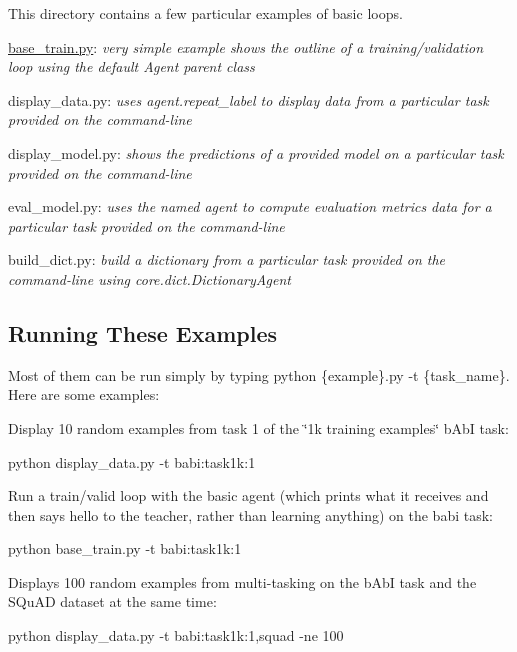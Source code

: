 This directory contains a few particular examples of basic loops.


\begin{DoxyItemize}
\item \hyperlink{base__train_8py}{base\+\_\+train.\+py}\+: {\itshape very simple example shows the outline of a training/validation loop using the default Agent parent class}
\item display\+\_\+data.\+py\+: {\itshape uses agent.\+repeat\+\_\+label to display data from a particular task provided on the command-\/line}
\item display\+\_\+model.\+py\+: {\itshape shows the predictions of a provided model on a particular task provided on the command-\/line}
\item eval\+\_\+model.\+py\+: {\itshape uses the named agent to compute evaluation metrics data for a particular task provided on the command-\/line}
\item build\+\_\+dict.\+py\+: {\itshape build a dictionary from a particular task provided on the command-\/line using core.\+dict.\+Dictionary\+Agent}
\end{DoxyItemize}

\subsection*{Running These Examples}

Most of them can be run simply by typing {\ttfamily python \{example\}.py -\/t \{task\+\_\+name\}}. Here are some examples\+:

Display 10 random examples from task 1 of the \char`\"{}1k training examples\char`\"{} b\+AbI task\+: 
\begin{DoxyCode}
python display\_data.py -t babi:task1k:1
\end{DoxyCode}


Run a train/valid loop with the basic agent (which prints what it receives and then says hello to the teacher, rather than learning anything) on the babi task\+: 
\begin{DoxyCode}
python base\_train.py -t babi:task1k:1
\end{DoxyCode}


Displays 100 random examples from multi-\/tasking on the b\+AbI task and the S\+Qu\+AD dataset at the same time\+: 
\begin{DoxyCode}
python display\_data.py -t babi:task1k:1,squad -ne 100
\end{DoxyCode}


